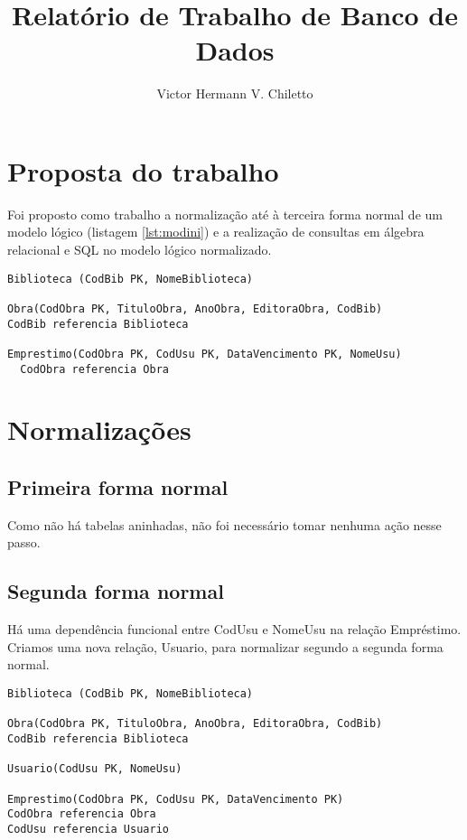 \documentclass[12pt]{article}
\title{Relatório de Trabalho de Banco de Dados}
\author{Victor Hermann V. Chiletto}
\begin{document}
 

\maketitle

\section{Proposta do trabalho}

Foi proposto como trabalho a normalização até à terceira forma normal de um modelo lógico (listagem \ref{lst:modini}) e a realização de consultas em álgebra relacional e SQL no modelo lógico normalizado.

\begin{lstlisting}[caption=Modelo lógico inicial, label={lst:modini}]
Biblioteca (CodBib PK, NomeBiblioteca)

Obra(CodObra PK, TituloObra, AnoObra, EditoraObra, CodBib)
CodBib referencia Biblioteca

Emprestimo(CodObra PK, CodUsu PK, DataVencimento PK, NomeUsu)
  CodObra referencia Obra
\end{lstlisting}

\section{Normalizações}
  \subsection{Primeira forma normal}
    Como não há tabelas aninhadas, não foi necessário tomar nenhuma ação nesse passo.

  \subsection{Segunda forma normal}
    Há uma dependência funcional entre CodUsu e NomeUsu na relação Empréstimo. Criamos uma nova relação, Usuario, para normalizar segundo a segunda forma normal.

    \begin{lstlisting}[caption=Modelo lógico na segunda forma normal, label={lst:mod2fn}]
Biblioteca (CodBib PK, NomeBiblioteca)

Obra(CodObra PK, TituloObra, AnoObra, EditoraObra, CodBib)
CodBib referencia Biblioteca

Usuario(CodUsu PK, NomeUsu)

Emprestimo(CodObra PK, CodUsu PK, DataVencimento PK)
CodObra referencia Obra
CodUsu referencia Usuario
    \end{lstlisting}
  
\end{document}

